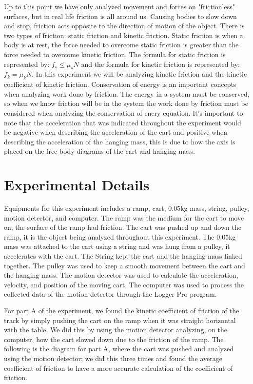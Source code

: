 \documentclass[aps,letterpaper,11pt]{revtex4}
\begin{document}
Up to this point we have only analyzed movement and forces on "frictionless" surfaces, but in real life friction is all around us. Causing bodies to slow down and stop, friction acts opposite to the direction of motion of the object. There is two types of friction: static friction and kinetic friction. Static friction is when a body is at rest, the force needed to overcome static friction is greater than the force needed to overcome kinetic friction. The formula for static friction is represented by: $f_s \leq \mu_sN$ and the formula for kinetic friction is represented by: $f_k = \mu_kN$. In this experiment we will be analyzing kinetic friction and the kinetic coefficient of kinetic friction. Conservation of energy is an important concepts when analyzing work done by friction. The energy in a system must be conserved, so when we know friction will be in the system the work done by friction must be considered when analyzing the conservation of enery equation. It's important to note that the acceleration that was indicated throughout the experiment would be negative when describing the acceleration of the cart and positive when describing the acceleration of the hanging mass, this is due to how the axis is placed on the free body diagrams of the cart and hanging mass.

\section{Experimental Details}

Equipments for this experiment includes a ramp, cart, 0.05kg mass, string, pulley, motion detector, and computer. The ramp was the medium for the cart to move on, the surface of the ramp had friction. The cart was pushed up and down the ramp, it is the object being analyzed throughout this experiment. The 0.05kg mass was attached to the cart using a string and was hung from a pulley, it accelerates with the cart. The String kept the cart and the hanging mass linked together. The pulley was used to keep a smooth movement between the cart and the hanging mass. The motion detector was used to calculate the acceleration, velocity, and position of the moving cart. The computer was used to process the collected data of the motion detector through the Logger Pro program. 

For part A of the experiment, we found the kinetic coefficient of friction of the track by simply pushing the cart on the ramp when it was straight horizontal with the table. We did this by using the motion detector analyzing, on the computer, how the cart slowed down due to the friction of the ramp. The following is the diagram for part A, where the cart was pushed and analyzed using the motion detector; we did this three times and found the average coefficient of friction to have a more accurate calculation of the coefficient of friction.
\end{document}
